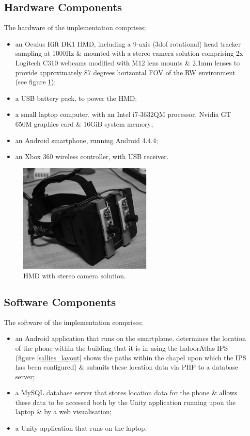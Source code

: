 \subsection{Hardware Components}
The hardware of the implementation comprises;

\begin{itemize}
	\item an Oculus Rift DK1 HMD, including a 9-axis (3dof rotational) head tracker sampling at 1000Hz \& mounted with a stereo camera solution comprising 2x Logitech C310 webcams modified with M12 lens mounts \& 2.1mm lenses to provide approximately 87 degrees horizontal FOV of the RW environment (see figure \ref{rift});
	\item a USB battery pack, to power the HMD;
	\item a small laptop computer, with an Intel i7-3632QM processor, Nvidia GT 650M graphics card \& 16GiB system memory;
	\item an Android smartphone, running Android 4.4.4;
	\item an Xbox 360 wireless controller, with USB receiver.
\end{itemize}

\begin{figure}[h]
	\begin{center}
		\includegraphics[width=0.6\textwidth]{images/rift.png}
		\caption{HMD with stereo camera solution.}
		\label{rift}
	\end{center}
\end{figure}

\subsection{Software Components}
The software of the implementation comprises;

\begin{itemize}
	\item an Android application that runs on the smartphone, determines the location of the phone within the building that it is in using the IndoorAtlas IPS~\cite{IndoorAtlasLtd.2012} (figure \ref{sallies_layout} shows the paths within the chapel upon which the IPS has been configured) \& submits these location data via PHP to a database server;
	\item a MySQL database server that stores location data for the phone \& allows these data to be accessed both by the Unity application running upon the laptop \& by a web visualisation;
	\item a Unity application that runs on the laptop.
\end{itemize}


